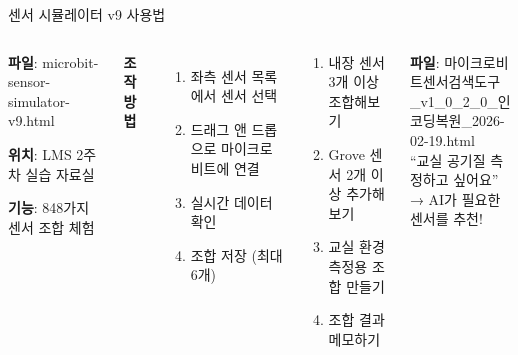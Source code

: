 \documentclass[aspectratio=169]{beamer}
\begin{document}
\begin{frame}{센서 시뮬레이터 v9 사용법}
  \begin{columns}
    \begin{tcolorbox}[title=실습 도구 안내]
      \textbf{파일}: microbit-sensor-simulator-v9.html
      
      \vspace{0.3em}
      \textbf{위치}: LMS 2주차 실습 자료실
      
      \vspace{0.3em}
      \textbf{기능}: 848가지 센서 조합 체험
    \end{tcolorbox}
    
    \vspace{0.5em}
    
    \textbf{조작 방법}
    \begin{enumerate}
      \item 좌측 센서 목록에서 센서 선택
      \item 드래그 앤 드롭으로 마이크로비트에 연결
      \item 실시간 데이터 확인
      \item 조합 저장 (최대 6개)
    \end{enumerate}
    
    \begin{tcolorbox}[colframe=accentgreen, title=실습 과제]
      \begin{enumerate}
        \item 내장 센서 3개 이상 조합해보기
        \item Grove 센서 2개 이상 추가해보기
        \item 교실 환경 측정용 조합 만들기
        \item 조합 결과 메모하기
      \end{enumerate}
    \end{tcolorbox}
    
    \vspace{0.5em}
    
    \begin{tcolorbox}[title=센서 검색 도구]
      \small
      \textbf{파일}: 마이크로비트센서검색도구\\
      \_v1\_0\_2\_0\_인코딩복원\_2026-02-19.html\\[0.3em]
      ``교실 공기질 측정하고 싶어요''\\
      → AI가 필요한 센서를 추천!
    \end{tcolorbox}
  \end{columns}
\end{frame}
\end{document}
